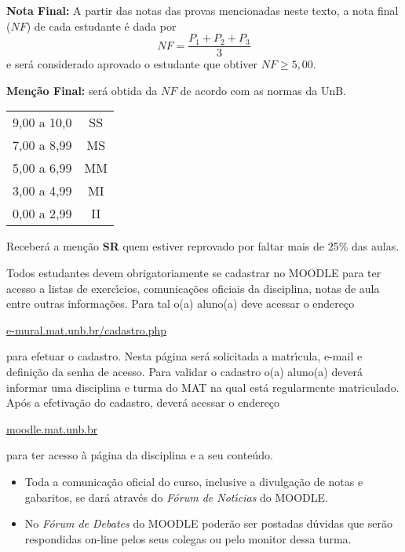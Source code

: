 \documentclass[12pt]{article}
\begin{document}
{\bf \noindent Nota Final:} A partir das notas das provas mencionadas neste texto, a nota final ($NF$) de cada estudante \'{e} dada
por
\vspace{-0.15cm}
\[
NF = \frac{ P_1 + P_2 + P_3}{3}
\]
e ser\'{a} considerado aprovado o estudante que obtiver $NF \geq 5,00$.

{\bf \noindent Men\c{c}\~{a}o Final:} ser\'{a} obtida da $NF$ de
acordo com as normas da UnB.
\begin{center}
    \begin{tabular}{c|c}
        \hline\hline
        \hspace{1cm}{Nota}\hspace{1cm} & \hspace{0.25cm}{Men\c{c}\~{a}o}\hspace{0.25cm}\\
        \hline\hline
        9,00 a 10,0 & SS \\
        \hline
        7,00 a 8,99 & MS \\
        \hline
        5,00 a 6,99 & MM \\
        \hline
        3,00 a 4,99 & MI \\
        \hline
        0,00 a 2,99  & II \\
        \hline\hline
    \end{tabular}
\end{center}
Receber{\'a} a men{\c c}{\~a}o {\bf SR} quem estiver reprovado por faltar mais de 25\%
das aulas.

 Todos estudantes devem
obrigatoriamente se cadastrar no MOODLE para ter acesso a listas de exerc{\'\i}cios, comunica\c{c}\~oes oficiais da disciplina, notas de aula entre outras informa\c{c}\~oes. Para tal o(a) aluno(a) deve acessar o endere\c{c}o
\begin{center}
    \url{e-mural.mat.unb.br/cadastro.php}
\end{center}
 para efetuar o cadastro. Nesta p\'agina ser\'a solicitada a matr{\'\i}cula, e-mail e defini\c{c}\~ao da senha de acesso. Para validar o cadastro o(a) aluno(a) dever\'a informar uma disciplina e turma do MAT na qual est\'a regularmente matriculado. Ap\'os a efetiva\c{c}\~ao do cadastro, dever\'a acessar o endere\c{c}o 
 \begin{center}
     \url{moodle.mat.unb.br}
 \end{center}
  para ter acesso \`a p\'agina da disciplina e a seu conte\'udo.


\begin{itemize}
\item Toda a comunica\c{c}\~{a}o oficial do curso, inclusive a divulga\c{c}\~{a}o de
notas e gabaritos, se dar\'{a} atrav\'{e}s do {\em F\'{o}rum de Not\'{\i}cias} do
MOODLE.\vspace{-0.20cm}
\item No {\em F\'{o}rum de Debates} do MOODLE poder\~{a}o ser
postadas d\'{u}vidas que ser\~{a}o respondidas on-line pelos seus
colegas ou pelo monitor dessa turma.
\end{itemize}
\end{document}
